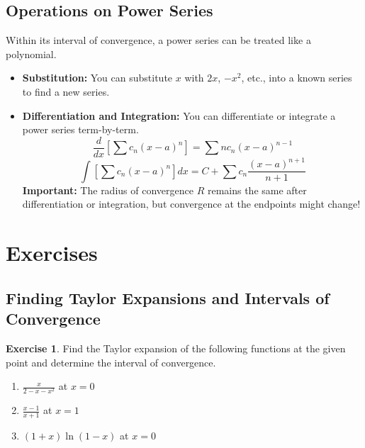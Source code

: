 \documentclass[11pt]{article}
\theoremstyle{definition}
\newtheorem{exercise}{Exercise}[section]
\begin{document}
\subsection{Operations on Power Series}
Within its interval of convergence, a power series can be treated like a polynomial.
\begin{itemize}
    \item \textbf{Substitution:} You can substitute $x$ with $2x$, $-x^2$, etc., into a known series to find a new series.
    \item \textbf{Differentiation and Integration:} You can differentiate or integrate a power series term-by-term.
    \[ \frac{d}{dx} \left[ \sum c_n(x-a)^n \right] = \sum n c_n (x-a)^{n-1} \]
    \[ \int \left[ \sum c_n(x-a)^n \right] dx = C + \sum c_n \frac{(x-a)^{n+1}}{n+1} \]
    \textbf{Important:} The radius of convergence $R$ remains the same after differentiation or integration, but convergence at the endpoints might change!
\end{itemize}

\section{Exercises}

\subsection{Finding Taylor Expansions and Intervals of Convergence}

\begin{exercise}
Find the Taylor expansion of the following functions at the given point and determine the interval of convergence.
\begin{enumerate}
    \item $\displaystyle \frac{x}{2-x-x^2}$ at $x=0$
    \item $\displaystyle \frac{x-1}{x+1}$ at $x=1$
    \item $\displaystyle (1+x)\ln(1-x)$ at $x=0$
\end{enumerate}
\end{exercise}
\end{document}
